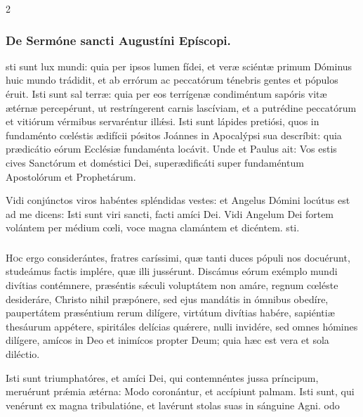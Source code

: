 \documentclass[9pt,twoside]{extarticle}
\begin{document}
\begin{multicols}{2}
\subsubsection*{\center De Sermóne sancti Augustíni Epíscopi.}
\begin{center}\end{center}
sti sunt lux mundi: quia per ipsos lumen fídei, et veræ sciéntæ primum Dóminus huic mundo trádidit, et ab errórum ac peccatórum ténebris gentes et pópulos éruit. Isti sunt sal terræ: quia per eos terrígenæ condiméntum sapóris vitæ ætérnæ percepérunt, ut restríngerent carnis lascíviam, et a putrédine peccatórum et vitiórum vérmibus servaréntur illǽsi. Isti sunt lápides pretiósi, quos in fundaménto cœléstis ædifícii pósitos Joánnes in Apocalýpsi sua descríbit: quia prædicátio eórum Ecclésiæ fundaménta locávit. Unde et Paulus ait: Vos estis cives Sanctórum et doméstici Dei, superædificáti super fundaméntum Apostolórum et Prophetárum.

\begin{tightlist}{}
\item {} Vidi conjúnctos viros habéntes spléndidas vestes: et Angelus Dómini locútus est ad me dicens: \textred{*} Isti sunt viri sancti, facti amíci Dei.
 Vidi Angelum Dei fortem volántem per médium cœli, voce magna clamántem et dicéntem. sti.
\end{tightlist}

\subsubsection*{\center {}}
\lettrine{H}oc ergo considerántes, fratres caríssimi, quæ tanti duces pópuli nos docuérunt, studeámus factis implére, quæ illi jussérunt. Discámus eórum exémplo mundi divítias contémnere, præséntis sǽculi voluptátem non amáre, regnum cœléste desideráre, Christo nihil præpónere, sed ejus mandátis in ómnibus obedíre, paupertátem præséntium rerum dilígere, virtútum divítias habére, sapiéntiæ thesáurum appétere, spiritáles delícias quǽrere, nulli invidére, sed omnes hómines dilígere, amícos in Deo et inimícos propter Deum; quia hæc est vera et sola diléctio.

\begin{tightlist}{}
\item {} Isti sunt triumphatóres, et amíci Dei, qui contemnéntes jussa príncipum, meruérunt prǽmia ætérna: \textred{*} Modo coronántur, et accípiunt palmam.
 Isti sunt, qui venérunt ex magna tribulatióne, et lavérunt stolas suas in sánguine Agni. odo
\end{tightlist}


\end{multicols}
\end{document}
